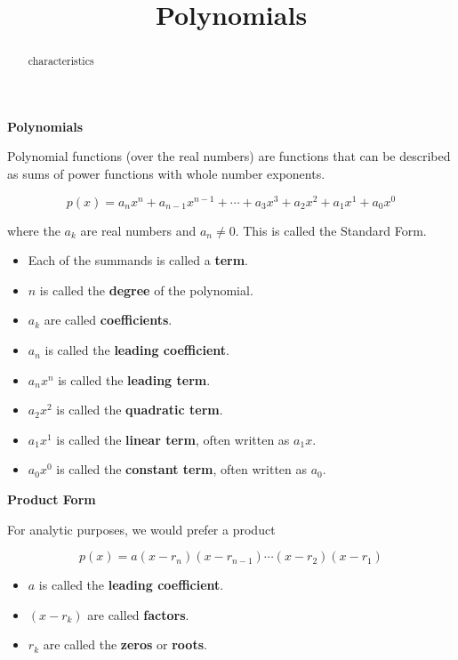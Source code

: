 \documentclass{ximera}
\title{Polynomials}
\begin{document}
\begin{abstract}
characteristics
\end{abstract}
\maketitle




\begin{idea} \textbf{\textcolor{blue!55!black}{Polynomials}} 


Polynomial functions (over the real numbers) are functions that can be described as sums of power functions with whole number exponents.


\[    p(x) = a_n x^n + a_{n-1} x^{n-1} + \cdots + a_3 x^3 + a_2 x^2 + a_1 x^1 + a_0 x^0      \]

where the $a_k$ are real numbers and $a_n \ne 0$.
This is called the Standard Form.


\begin{itemize}
\item Each of the summands is called a \textbf{term}.  
\item $n$ is called the \textbf{degree} of the polynomial.
\item $a_k$ are called \textbf{coefficients}.
\item $a_n$ is called the \textbf{leading coefficient}.
\item $a_n x^n$ is called the \textbf{leading term}.
\item $a_2 x^2$ is called the \textbf{quadratic term}.
\item $a_1 x^1$ is called the \textbf{linear term}, often written as $a_1 x$.
\item $a_0 x^0$ is called the \textbf{constant term}, often written as $a_0$.

\end{itemize}

\end{idea}




\textbf{\textcolor{blue!55!black}{Product Form}} 

For analytic purposes, we would prefer a product

\[   p(x) = a (x-r_n)(x-r_{n-1})  \cdots (x-r_2)(x-r_1)  \]


\begin{itemize}

\item $a$ is called the \textbf{leading coefficient}.
\item $(x-r_k)$ are called \textbf{factors}.
\item $r_k$ are called the \textbf{zeros} or \textbf{roots}.

\end{itemize}
\end{document}
